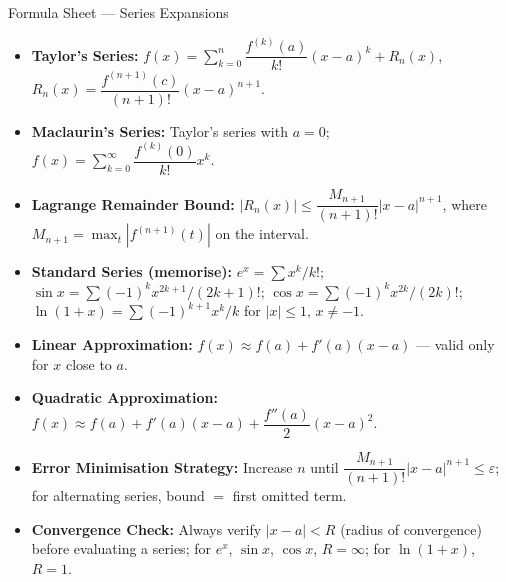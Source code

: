 \documentclass[12pt,a4paper]{article}
\begin{document}
\begin{learnbox}{Formula Sheet --- Series Expansions}
\begin{itemize}[leftmargin=1.5em]
  \item \textbf{Taylor's Series:}
        \(f(x) = \sum_{k=0}^{n}\dfrac{f^{(k)}(a)}{k!}(x-a)^k + R_n(x)\),\quad
        \(R_n(x) = \dfrac{f^{(n+1)}(c)}{(n+1)!}(x-a)^{n+1}\).

  \item \textbf{Maclaurin's Series:} Taylor's series with \(a = 0\);
        \(f(x) = \sum_{k=0}^{\infty}\dfrac{f^{(k)}(0)}{k!}x^k\).

  \item \textbf{Lagrange Remainder Bound:}
        \(|R_n(x)| \leq \dfrac{M_{n+1}}{(n+1)!}|x-a|^{n+1}\),\quad
        where \(M_{n+1} = \max_{t}|f^{(n+1)}(t)|\) on the interval.

  \item \textbf{Standard Series (memorise):}
        \(e^x = \sum x^k/k!\);\quad
        \(\sin x = \sum (-1)^k x^{2k+1}/(2k+1)!\);\quad
        \(\cos x = \sum (-1)^k x^{2k}/(2k)!\);\quad
        \(\ln(1+x) = \sum (-1)^{k+1} x^k/k\) for \(|x|\leq 1,\,x\neq -1\).

  \item \textbf{Linear Approximation:}
        \(f(x) \approx f(a) + f'(a)(x-a)\) --- valid only for \(x\) close to \(a\).

  \item \textbf{Quadratic Approximation:}
        \(f(x) \approx f(a) + f'(a)(x-a) + \dfrac{f''(a)}{2}(x-a)^2\).

  \item \textbf{Error Minimisation Strategy:}
        Increase \(n\) until \(\dfrac{M_{n+1}}{(n+1)!}|x-a|^{n+1} \leq \varepsilon\);
        for alternating series, bound \(=\) first omitted term.

  \item \textbf{Convergence Check:}
        Always verify \(|x-a| < R\) (radius of convergence) before evaluating a series;
        for \(e^x\), \(\sin x\), \(\cos x\), \(R = \infty\); for \(\ln(1+x)\), \(R = 1\).
\end{itemize}
\end{learnbox}
\end{document}
